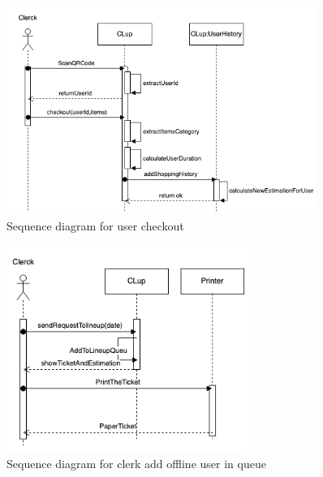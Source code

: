 \begin{figure}[H]
  \centering
  \includegraphics[width=0.9\textwidth,keepaspectratio]{images/Checkout_sd.png}
  \caption{Sequence diagram for user checkout}
\end{figure}

\begin{figure}[H]
  \centering
  \includegraphics[width=0.7\textwidth,keepaspectratio]{images/PrintTicket_sd.png}
  \caption{Sequence diagram for clerk add offline user in queue}
\end{figure}
\clearpage

\setcounter{tocdepth}{3}
\setcounter{secnumdepth}{3}